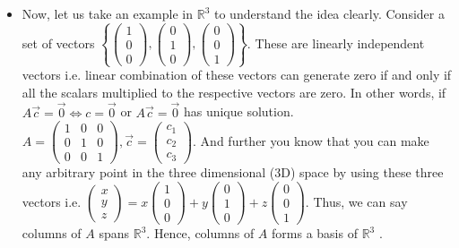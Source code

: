 \documentclass{article}
\begin{document}
\begin{itemize}
\item Now, let us take an example in $\mathbb{R}^3$ to understand the idea clearly. Consider a set of vectors \(\left\{
\begin{pmatrix}
1\\0\\0
\end{pmatrix},
\begin{pmatrix}
0\\1\\0
\end{pmatrix},
\begin{pmatrix}
0\\0\\1
\end{pmatrix}
\right\}\). These are linearly independent vectors i.e. linear combination of these vectors can generate zero if and only if all the scalars multiplied to the respective vectors are zero. In other words, if  $A\vec{c}=\vec{0} \iff c= \Vec{0}$ or $A\vec{c} =\vec{0}$ has unique solution.\\
\( A=\begin{pmatrix}
1 & 0 & 0\\
0 & 1 & 0\\
0 & 0 & 1
\end{pmatrix}, \vec{c}=
\begin{pmatrix}
c_1\\
c_2\\
c_3
\end{pmatrix}\). And further you know that you can make any arbitrary point in the three dimensional (3D) space by using these three vectors i.e.
\(\begin{pmatrix}
x\\y\\z
\end{pmatrix}=x
\begin{pmatrix}
1\\0\\0
\end{pmatrix} + y\begin{pmatrix}
0\\1\\0
\end{pmatrix} + z\begin{pmatrix}
0\\0\\1
\end{pmatrix}\). Thus, we can say columns of $A$ spans $\mathbb{R}^3$. Hence, columns of $A$ forms a basis of $\mathbb{R}^3$ .


\end{itemize}
\end{document}

